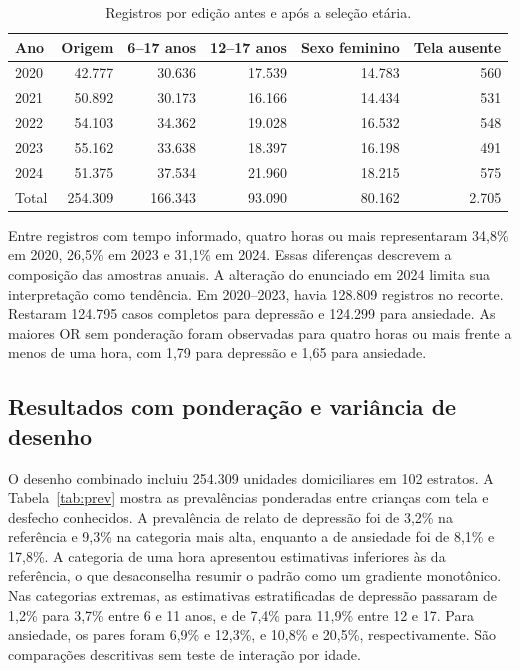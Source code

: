 ﻿\documentclass[12pt]{article}
\begin{document}
\begin{table}[htbp]
\centering
\caption{Registros por edição antes e após a seleção etária.}
\label{tab:fluxo}
\begin{tabular}{lrrrrr}\hline
Ano & Origem & 6--17 anos & 12--17 anos & Sexo feminino & Tela ausente \\\hline
2020 & 42.777 & 30.636 & 17.539 & 14.783 & 560 \\
2021 & 50.892 & 30.173 & 16.166 & 14.434 & 531 \\
2022 & 54.103 & 34.362 & 19.028 & 16.532 & 548 \\
2023 & 55.162 & 33.638 & 18.397 & 16.198 & 491 \\
2024 & 51.375 & 37.534 & 21.960 & 18.215 & 575 \\\hline
Total & 254.309 & 166.343 & 93.090 & 80.162 & 2.705 \\\hline
\end{tabular}

\end{table}

Entre registros com tempo informado, quatro horas ou mais representaram 34,8\% em 2020, 26,5\% em 2023 e 31,1\% em 2024. Essas diferenças descrevem a composição das amostras anuais. A alteração do enunciado em 2024 limita sua interpretação como tendência. Em 2020--2023, havia 128.809 registros no recorte. Restaram 124.795 casos completos para depressão e 124.299 para ansiedade. As maiores OR sem ponderação foram observadas para quatro horas ou mais frente a menos de uma hora, com 1,79 para depressão e 1,65 para ansiedade.

\subsection{Resultados com ponderação e variância de desenho}
O desenho combinado incluiu 254.309 unidades domiciliares em 102 estratos. A Tabela~\ref{tab:prev} mostra as prevalências ponderadas entre crianças com tela e desfecho conhecidos. A prevalência de relato de depressão foi de 3,2\% na referência e 9,3\% na categoria mais alta, enquanto a de ansiedade foi de 8,1\% e 17,8\%. A categoria de uma hora apresentou estimativas inferiores às da referência, o que desaconselha resumir o padrão como um gradiente monotônico. Nas categorias extremas, as estimativas estratificadas de depressão passaram de 1,2\% para 3,7\% entre 6 e 11 anos, e de 7,4\% para 11,9\% entre 12 e 17. Para ansiedade, os pares foram 6,9\% e 12,3\%, e 10,8\% e 20,5\%, respectivamente. São comparações descritivas sem teste de interação por idade.
\end{document}
